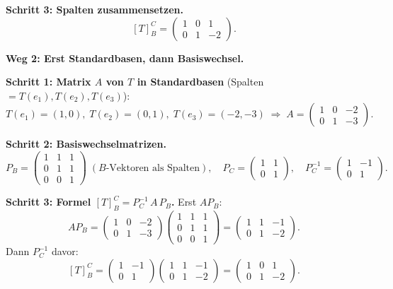 \documentclass[a4paper,12pt]{article}
\begin{document}
\textbf{Schritt 3: Spalten zusammensetzen.}
\[
[T]_B^C = \begin{pmatrix} 1 & 0 & 1 \\ 0 & 1 & -2 \end{pmatrix}.
\]

\bigskip

\textbf{Weg 2: Erst Standardbasen, dann Basiswechsel.}

\textbf{Schritt 1: Matrix $A$ von $T$ in Standardbasen} (Spalten $= T(e_1), T(e_2), T(e_3)$):
\[
T(e_1) = (1, 0),\; T(e_2) = (0, 1),\; T(e_3) = (-2, -3)
\;\Rightarrow\;
A = \begin{pmatrix} 1 & 0 & -2 \\ 0 & 1 & -3 \end{pmatrix}.
\]

\textbf{Schritt 2: Basiswechselmatrizen.}
\[
P_B = \begin{pmatrix} 1 & 1 & 1 \\ 0 & 1 & 1 \\ 0 & 0 & 1 \end{pmatrix} \;(\text{$B$-Vektoren als Spalten}), \quad
P_C = \begin{pmatrix} 1 & 1 \\ 0 & 1 \end{pmatrix}, \quad
P_C^{-1} = \begin{pmatrix} 1 & -1 \\ 0 & 1 \end{pmatrix}.
\]

\textbf{Schritt 3: Formel $[T]_B^C = P_C^{-1}\, A\, P_B$.} Erst $A P_B$:
\[
A P_B = \begin{pmatrix} 1 & 0 & -2 \\ 0 & 1 & -3 \end{pmatrix}\begin{pmatrix} 1 & 1 & 1 \\ 0 & 1 & 1 \\ 0 & 0 & 1 \end{pmatrix}
= \begin{pmatrix} 1 & 1 & -1 \\ 0 & 1 & -2 \end{pmatrix}.
\]
Dann $P_C^{-1}$ davor:
\[
[T]_B^C = \begin{pmatrix} 1 & -1 \\ 0 & 1 \end{pmatrix}\begin{pmatrix} 1 & 1 & -1 \\ 0 & 1 & -2 \end{pmatrix}
= \begin{pmatrix} 1 & 0 & 1 \\ 0 & 1 & -2 \end{pmatrix}.
\]
\end{document}
